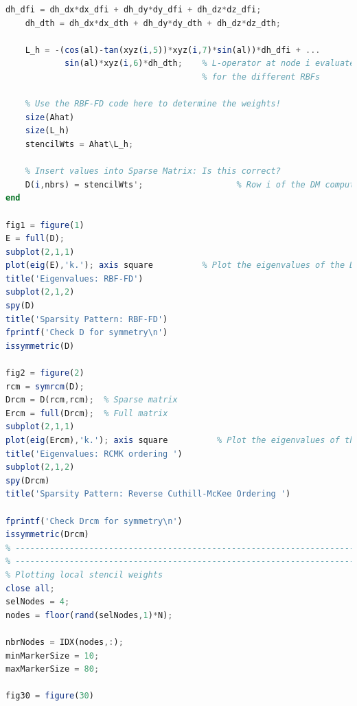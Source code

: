 \documentclass[11pt]{article}
\def\L{\mathcal{L}} %
\begin{document}
\begin{lstlisting}[language=octave]
    dh_dfi = dh_dx*dx_dfi + dh_dy*dy_dfi + dh_dz*dz_dfi;
    dh_dth = dh_dx*dx_dth + dh_dy*dy_dth + dh_dz*dz_dth;
        
    L_h = -(cos(al)-tan(xyz(i,5))*xyz(i,7)*sin(al))*dh_dfi + ...
            sin(al)*xyz(i,6)*dh_dth;    % L-operator at node i evaluated 
                                        % for the different RBFs
    
    % Use the RBF-FD code here to determine the weights!   
    size(Ahat)
    size(L_h)
    stencilWts = Ahat\L_h;
    
    % Insert values into Sparse Matrix: Is this correct?
    D(i,nbrs) = stencilWts';                   % Row i of the DM computed
end

fig1 = figure(1)
E = full(D);
subplot(2,1,1)
plot(eig(E),'k.'); axis square          % Plot the eigenvalues of the DM
title('Eigenvalues: RBF-FD')
subplot(2,1,2)
spy(D)
title('Sparsity Pattern: RBF-FD')
fprintf('Check D for symmetry\n')
issymmetric(D)

fig2 = figure(2)
rcm = symrcm(D);
Drcm = D(rcm,rcm);  % Sparse matrix
Ercm = full(Drcm);  % Full matrix
subplot(2,1,1)
plot(eig(Ercm),'k.'); axis square          % Plot the eigenvalues of the DM
title('Eigenvalues: RCMK ordering ')
subplot(2,1,2)
spy(Drcm)
title('Sparsity Pattern: Reverse Cuthill-McKee Ordering ')

fprintf('Check Drcm for symmetry\n')
issymmetric(Drcm)
% -------------------------------------------------------------------------
% -------------------------------------------------------------------------
% Plotting local stencil weights
close all;
selNodes = 4;
nodes = floor(rand(selNodes,1)*N);

nbrNodes = IDX(nodes,:);
minMarkerSize = 10;
maxMarkerSize = 80;

fig30 = figure(30)


\end{lstlisting}
\end{document}
